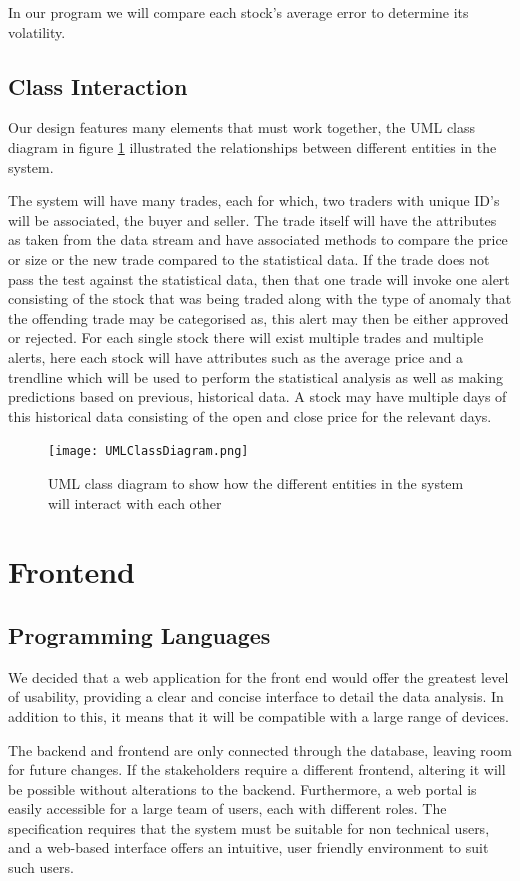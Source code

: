 \documentclass[11pt, oneside, a4paper]{article}
\begin{document}
In our program we will compare each stock’s average error to determine its volatility.

\subsection{Class Interaction}
Our design features many elements that must work together, the UML class diagram
in figure \ref{ClassDiagram} illustrated the relationships between different
entities in the system.

The system will have many trades, each for which, two traders with unique ID's
will be associated, the buyer and seller. The trade itself will have the attributes
as taken from the data stream and have associated methods to compare the price or
size or the new trade compared to the statistical data. If the trade does not pass
the test against the statistical data, then that one trade will invoke one alert
consisting of the stock that was being traded along with the type of anomaly that
the offending trade may be categorised as, this alert may then be either approved
or rejected. For each single stock there will exist multiple trades and multiple
alerts, here each stock will have attributes such as the average price and a
trendline which will be used to perform the statistical analysis as well as making
predictions based on previous, historical data. A stock may have multiple days of
this historical data consisting of the open and close price for the relevant days.

\begin{figure}[h]
	\centering
		\texttt{[image: UMLClassDiagram.png]}
	\caption{UML class diagram to show how the different entities in the system will interact with each other}
	\label{ClassDiagram}
\end{figure}

\section{Frontend}
\subsection{Programming Languages}
We decided that a web application for the front end would offer the greatest level
of usability, providing a clear and concise interface to detail the data analysis.
In addition to this, it means that it will be compatible with a large range of
devices.

The backend and frontend are only connected through the database, leaving room for
future changes. If the stakeholders require a different frontend, altering it will
be possible without alterations to the backend. Furthermore, a web portal is easily
accessible for a large team of users, each with different roles. The specification
requires that the system must be suitable for non technical users, and a web-based
interface offers an intuitive, user friendly environment to suit such users.
\end{document}
